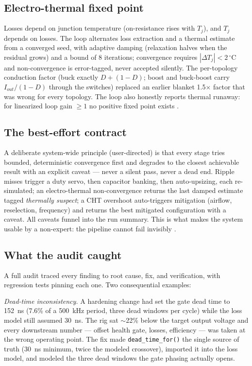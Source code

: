 \documentclass[conference]{IEEEtran}
\begin{document}
\subsection{Electro-thermal fixed point}
Losses depend on junction temperature (on-resistance rises with $T_j$),
and $T_j$ depends on losses. The loop alternates loss extraction and a
thermal estimate from a converged seed, with adaptive damping
(relaxation halves when the residual grows) and a bound of 8 iterations;
convergence requires $|\Delta T_j| < 2\,^\circ$C and non-convergence is
error-tagged, never accepted silently. The per-topology conduction
factor (buck exactly $D+(1-D)$; boost and buck-boost carry
$I_{out}/(1-D)$ through the switches) replaced an earlier blanket
1.5$\times$ factor that was wrong for every topology. The loop also
honestly reports thermal runaway: for linearized loop gain $\geq 1$ no
positive fixed point exists \cite{audit}.

\subsection{The best-effort contract}
A deliberate system-wide principle (user-directed) is that every stage
tries bounded, deterministic convergence first and degrades to the
closest achievable result with an explicit caveat --- never a silent
pass, never a dead end. Ripple misses trigger a duty servo, then
capacitor banking, then auto-upsizing, each re-simulated; an
electro-thermal non-convergence returns the last damped estimate tagged
\emph{thermally suspect}; a CHT overshoot auto-triggers mitigation
(airflow, reselection, frequency) and returns the best mitigated
configuration with a caveat. All caveats funnel into the run summary.
This is what makes the system usable by a non-expert: the pipeline
cannot fail invisibly \cite{audit}.

\subsection{What the audit caught}
A full audit \cite{audit} traced every finding to root cause, fix, and
verification, with regression tests pinning each one. Two
consequential examples:

\emph{Dead-time inconsistency.} A hardening change had set the gate
dead time to \SI{152}{ns} (7.6\% of a \SI{500}{kHz} period, three dead
windows per cycle) while the loss model still assumed \SI{30}{ns}. The
rig sat $\sim$22\% below the target output voltage and every downstream
number --- offset health gate, losses, efficiency --- was taken at the
wrong operating point. The fix made \texttt{dead\_time\_for()} the
single source of truth (\SI{30}{ns} minimum, twice the modeled
crossover), imported it into the loss model, and modeled the three dead
windows the gate phasing actually opens.
\end{document}

